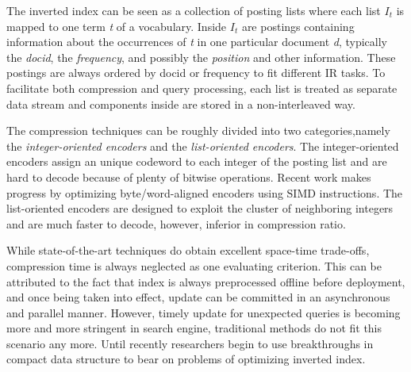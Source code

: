\documentclass[runningheads,a4paper]{llncs}
\begin{document}

The inverted index can be seen as a collection of posting lists where each list $I_t$ is mapped to one term \textit{t} of a vocabulary.
Inside $I_t$ are postings containing information about the occurrences of \textit{t} in one particular document \textit{d}, typically the \textit{docid}, the \textit{frequency}, and possibly the \textit{position} and other information.
These postings are always ordered by docid or frequency to fit different IR tasks\cite{navarro2010dual}.
To facilitate both compression and query processing, each list is treated as separate data stream and components inside are stored in a non-interleaved way. 

The compression techniques can be roughly divided into two categories,namely the \textit{integer-oriented encoders} and the \textit{list-oriented encoders}\cite{catena2014inverted,silvestri2010vsencoding}. The integer-oriented encoders assign an unique codeword to each integer of the posting list and are hard to decode because of plenty of bitwise operations. Recent work makes progress by optimizing byte/word-aligned encoders using SIMD instructions\cite{stepanov2011simd,trotman2014compression}. The list-oriented encoders are designed to exploit the cluster of neighboring integers and are much faster to decode, however, inferior in compression ratio.

While state-of-the-art techniques do obtain excellent space-time trade-offs, compression time is always neglected as one evaluating criterion. This can be attributed to the fact that index is always preprocessed offline before deployment, and once being taken into effect, update can be committed in an asynchronous and parallel manner. However, timely update for unexpected queries is becoming more and more stringent in search engine, traditional methods do not fit this scenario any more. Until recently researchers begin to use breakthroughs in compact data structure to bear on problems of optimizing inverted index\cite{navarro2010dual,ottaviano2014partitioned,petri2014score}.
\end{document}
